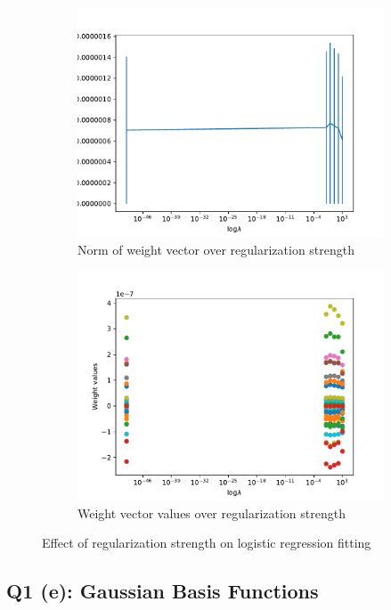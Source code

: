 \documentclass[11pt]{amsart}
\begin{document}
\begin{figure}[h!]
\begin{subfigure}{0.45\textwidth}
        \includegraphics[width=\textwidth]{q1d_norm.pdf}
        \caption{Norm of weight vector over regularization strength}
        \label{fig:1dnorm}
    \end{subfigure}
    \begin{subfigure}{0.45\textwidth}
        \includegraphics[width=\textwidth]{q1d_weights.pdf}
        \caption{Weight vector values over regularization strength}
        \label{fig:1dvals}
    \end{subfigure}
        \caption{Effect of regularization strength on logistic regression fitting}
    \label{fig:1d}
\end{figure}


\subsection{Q1 (e): Gaussian Basis Functions}
\end{document}
